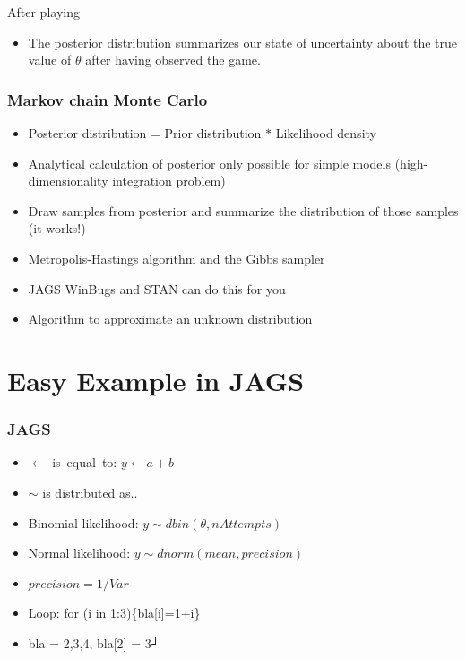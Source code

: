 \documentclass[hyperref={pdfpagelabels=false},unknownkeysallowed]{beamer}
\begin{document}
\begin{frame}
After playing
\begin{itemize}
\item The posterior distribution summarizes our state of uncertainty about the true value of $\theta$ after having observed the game. 
\end{itemize}
\note{}
\end{frame}


\begin{frame}
\frametitle{Markov chain Monte Carlo}
\begin{itemize}
\item Posterior distribution = Prior distribution $*$ Likelihood density
\item Analytical calculation of posterior only possible for simple models (high-dimensionality integration problem)
\item Draw samples from posterior and summarize the distribution of those samples (it works!)
\item Metropolis-Hastings algorithm and the Gibbs sampler
\item JAGS WinBugs and STAN can do this for you
\item Algorithm to approximate an unknown distribution

\end{itemize}
\end{frame}



\section{Easy Example in JAGS}

\begin{frame}
	\frametitle{JAGS}
	\begin{itemize}
	    \item $\leftarrow$ is~equal~to: $y \leftarrow a+b$
	    \item $\sim$ is distributed as..
	    \item Binomial likelihood: $y \sim dbin(\theta,nAttempts)$
		\item Normal likelihood: $ y \sim dnorm(mean,precision)$
		\item $precision = 1/ Var$
		\item Loop: for (i in 1:3)\{bla[i]=1+i\}
		\item bla = 2,3,4, bla[2] = 3┘
	\end{itemize} 
	\note{}
\end{frame}
\end{document}
